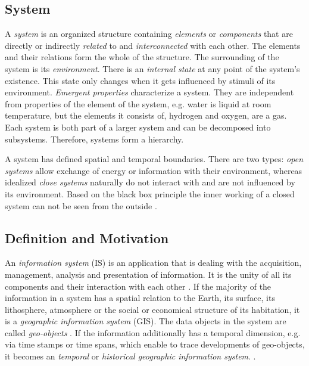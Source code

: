 
\subsection{System} %
\label{sub:system}

A \emph{system} is an organized structure containing \emph{elements} or \emph{components} that are directly or indirectly \emph{related} to and \emph{interconnected} with each other. The elements and their relations form the whole of the structure. The surrounding of the system is its \emph{environment}. There is an \emph{internal state} at any point of the system's existence. This state only changes when it gets influenced by stimuli of its environment. \emph{Emergent properties} characterize a system. They are independent from properties of the element of the system, e.g. water is liquid at room temperature, but the elements it consists of, hydrogen and oxygen, are a gas. Each system is both part of a larger system and can be decomposed into subsystems. Therefore, systems form a hierarchy.

A system has defined spatial and temporal boundaries. There are two types: \emph{open systems} allow exchange of energy or information with their environment, whereas idealized \emph{close systems} naturally do not interact with and are not influenced by its environment. Based on the black box principle the inner working of a closed system can not be seen from the outside
\cite{system}.


\subsection{Definition and Motivation} %
\label{sub:definition_and_motivation}

An \emph{information system} (IS) is an application that is dealing with the acquisition, management, analysis and presentation of information. It is the unity of all its components and their interaction with each other
\cite{informationSystem}.
If the majority of the information in a system has a spatial relation to the Earth, its surface, its lithosphere, atmosphere or the social or economical structure of its habitation, it is a \emph{geographic information system} (GIS). The data objects in the system are called \emph{geo-objects}
\cite{bolstad2008gis}.
If the information additionally has a temporal dimension, e.g. via time stamps or time spans, which enable to trace developments of geo-objects, it becomes an \emph{temporal} or \emph{historical geographic information system}.
\cite{gregory2014toward}.

